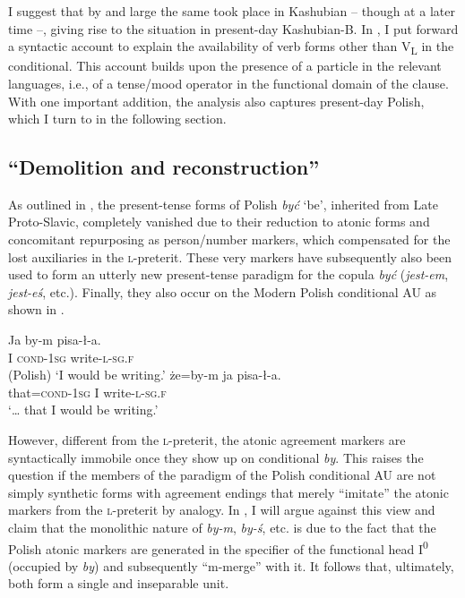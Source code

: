 \documentclass[output=paper]{langscibook}
\begin{document}
\noindent I suggest that by and large the same took place in Kashubian -- though at a later time --, giving rise to the situation in present-day Kashubian-B. In , I put forward a syntactic account to explain the availability of verb forms other than V\textsubscript{L} in the conditional. This account builds upon the presence of a particle in the relevant languages, i.e., of a tense/mood operator in the functional domain of the clause. With one important addition, the analysis also captures present-day Polish, which I turn to in the following section. 


\subsection{``Demolition and reconstruction''}\label{pitsch:sec:reconstruction}

As outlined in , the present-tense forms of Polish \textit{być} `be', inherited from Late Proto-Slavic, completely vanished due to their reduction to atonic forms and concomitant repurposing as person/number markers, which compensated for the lost auxiliaries in the \textsc{l-}preterit. These very markers have subsequently also been used to form an utterly new present-tense paradigm for the copula \textit{być} (\textit{jest-em}, \textit{jest-eś}, etc.). Finally, they also occur on the Modern Polish conditional AU as shown in .

\ea
\ea\gll Ja by-m pisa-ł-a. \\
I \textsc{cond-1sg} write\textsc{-l-sg.f} \\ \hfill (Polish)
\glt `I would be writing.' 
\ex
\gll {\ldots} że=by-m ja pisa-ł-a. \\
{} that=\textsc{cond-1sg} I write\textsc{-l-sg.f} \\
\glt `{\ldots} that I would be writing.' 
\z
\label{pitsch:ex:Polish_Cond}
\z

\noindent However, different from the \textsc{l-}preterit, the atonic agreement markers are syntactically immobile once they show up on conditional \textit{by}. This raises the question if the members of the paradigm of the Polish conditional AU are not simply synthetic forms with agreement endings that merely ``imitate'' the atonic markers from the \textsc{l-}preterit by analogy. In , I will argue against this view and claim that the monolithic nature of \textit{by-m}, \textit{by-ś}, etc. is due to the fact that the Polish atonic markers are generated in the specifier of the functional head I\textsuperscript{0} (occupied by \textit{by}) and subsequently ``m-merge'' \citep{Matushansky2006,Pietraszko2021} with it. It follows that, ultimately, both form a single and inseparable unit.
\end{document}
